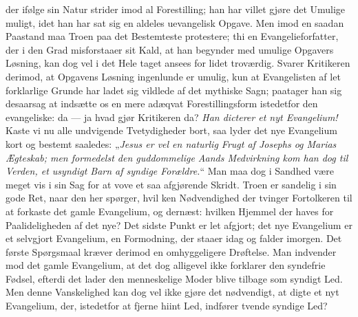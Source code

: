 \documentclass[12pt,a4paper]{book}
\begin{document}
der ifølge sin Natur strider imod al Forestilling; han har villet gjøre det
Umulige muligt, idet han har sat sig en aldeles uevangelisk Opgave. Men imod
en saadan Paastand maa Troen paa det Bestemteste protestere; thi en
Evangelieforfatter, der i den Grad misforstaaer sit Kald, at han begynder med
umulige Opgavers Løsning, kan dog vel i det Hele taget ansees for lidet
troværdig. Svarer Kritikeren derimod, at Opgavens Løsning ingenlunde er
umulig, kun at Evangelisten af let forklarlige Grunde har ladet sig vildlede
af det mythiske Sagn; paatager han sig desaarsag at indsætte os en mere
adæqvat Forestillingsform istedetfor den evangeliske: da --- ja hvad gjør
Kritikeren da? \emph{Han dicterer et nyt Evangelium!} Kaste vi nu alle
undvigende Tvetydigheder bort, saa lyder det nye Evangelium kort og bestemt
saaledes: „\emph{Jesus er vel en naturlig Frugt af Josephs og Marias
Ægteskab; men formedelst den guddommelige Aands Medvirkning kom han dog til
Verden, et usyndigt Barn af syndige Forældre.}“ Man maa dog i Sandhed være
meget vis i sin Sag for at vove et saa afgjørende Skridt. Troen er sandelig i
sin gode Ret, naar den her spørger, hvil\-%
ken Nødvendighed der tvinger Fortolkeren til at forkaste det gamle
Evangelium, og dernæst: hvilken Hjemmel der haves for Paalideligheden af det
nye? Det sidste Punkt er let afgjort; det nye Evangelium er et selvgjort
Evangelium, en Formodning, der staaer idag og falder imorgen. Det første
Spørgsmaal kræver derimod en omhyggeligere Drøftelse. Man indvender mod det
gamle Evangelium, at det dog alligevel ikke forklarer den syndefrie Fødsel,
efterdi det lader den menneskelige Moder blive tilbage som syndigt Led. Men
denne Vanskelighed kan dog vel ikke gjøre det nødvendigt, at digte et nyt
Evangelium, der, istedetfor at fjerne hiint Led, indfører tvende syndige Led?
\end{document}
